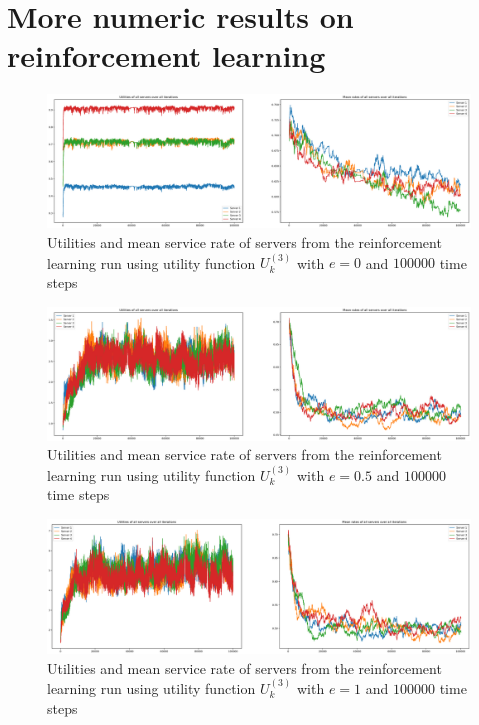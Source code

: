 \chapter{More numeric results on reinforcement learning}
\label{appendix:reinforcement_learning}

\begin{figure}[H]
    \includegraphics[width=\textwidth]{chapters/00_appendix/03_more_rl_results/Bin/utility_3_eps/u3_1_e0.eps}
    \caption{Utilities and mean service rate of servers from the reinforcement
    learning run using utility function \(U_k^{(3)}\) with \(e = 0\) and
    \(100000\) time steps}
    \label{fig:RL_utility3_1_e0}
\end{figure}

\begin{figure}[H]
    \includegraphics[width=\textwidth]{chapters/00_appendix/03_more_rl_results/Bin/utility_3_eps/u3_1_e05.eps}
    \caption{Utilities and mean service rate of servers from the reinforcement
    learning run using utility function \(U_k^{(3)}\) with \(e = 0.5\) and
    \(100000\) time steps}
    \label{fig:RL_utility3_1_e05}
\end{figure}

\begin{figure}[H]
    \includegraphics[width=\textwidth]{chapters/00_appendix/03_more_rl_results/Bin/utility_3_eps/u3_1_e1.eps}
    \caption{Utilities and mean service rate of servers from the reinforcement
    learning run using utility function \(U_k^{(3)}\) with \(e = 1\) and
    \(100000\) time steps}
    \label{fig:RL_utility3_1_e1}
\end{figure}

